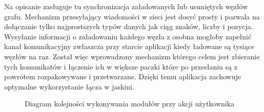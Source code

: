Na opisanie zasługuje tu synchronizacja załadowanych lub usuniętych węzłów grafu. Mechanizm przesyłający wiadomości w sieci jest dosyć prosty i pozwala na dołączanie tylko najprostszych typów danych jak ciąg znaków, liczby i pozycja. Wysyłanie informacji o załadowaniu każdego węzła z osobna mogłoby zapełnić kanał komunikacyjny zwłaszcza przy starcie aplikacji kiedy ładowane są tysiące węzłów na raz. Został więc wprowadzony mechanizm którego celem jest zbieranie tych komunikatów i łączenie ich w większe paczki które po przesłaniu są z powrotem rozpakowywane i przetwarzane. Dzięki temu aplikacja zachowuje optymalne wykorzystanie łącza w jaskini.


\begin{figure}[H]
\begin{center}
\end{center}
\caption{Diagram kolejności wykonywania modułów przy akcji użytkownika}
\end{figure}


